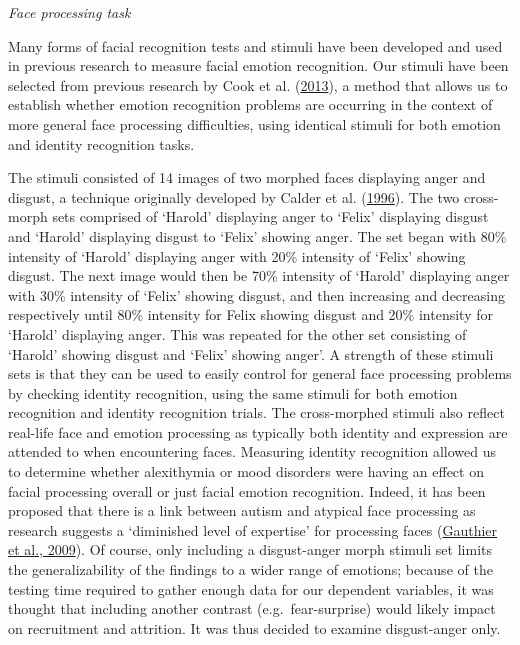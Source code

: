 \documentclass[
]{article}
\begin{document}
\emph{Face processing task}

Many forms of facial recognition tests and stimuli have been developed and used in previous research to measure facial emotion recognition. Our stimuli have been selected from previous research by Cook et al. (\protect\hyperlink{ref-cook2013a}{2013}), a method that allows us to establish whether emotion recognition problems are occurring in the context of more general face processing difficulties, using identical stimuli for both emotion and identity recognition tasks.

The stimuli consisted of 14 images of two morphed faces displaying anger and disgust, a technique originally developed by Calder et al. (\protect\hyperlink{ref-calder1996a}{1996}). The two cross-morph sets comprised of `Harold' displaying anger to `Felix' displaying disgust and `Harold' displaying disgust to `Felix' showing anger. The set began with 80\% intensity of `Harold' displaying anger with 20\% intensity of `Felix' showing disgust. The next image would then be 70\% intensity of `Harold' displaying anger with 30\% intensity of `Felix' showing disgust, and then increasing and decreasing respectively until 80\% intensity for Felix showing disgust and 20\% intensity for `Harold' displaying anger. This was repeated for the other set consisting of `Harold' showing disgust and `Felix' showing anger'. A strength of these stimuli sets is that they can be used to easily control for general face processing problems by checking identity recognition, using the same stimuli for both emotion recognition and identity recognition trials. The cross-morphed stimuli also reflect real-life face and emotion processing as typically both identity and expression are attended to when encountering faces. Measuring identity recognition allowed us to determine whether alexithymia or mood disorders were having an effect on facial processing overall or just facial emotion recognition. Indeed, it has been proposed that there is a link between autism and atypical face processing as research suggests a `diminished level of expertise' for processing faces (\protect\hyperlink{ref-gauthier2009a}{Gauthier et al., 2009}). Of course, only including a disgust-anger morph stimuli set limits the generalizability of the findings to a wider range of emotions; because of the testing time required to gather enough data for our dependent variables, it was thought that including another contrast (e.g.~fear-surprise) would likely impact on recruitment and attrition. It was thus decided to examine disgust-anger only.
\end{document}
